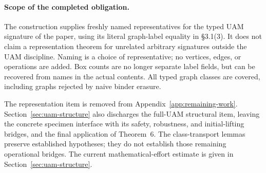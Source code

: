 


\paragraph{Scope of the completed obligation.}
The construction supplies freshly named representatives for the typed UAM
signature of the paper, using its literal graph-label equality in
\S3.1(3). It does not claim a representation theorem for unrelated arbitrary
signatures outside the UAM discipline. Naming is a choice of representative;
no vertices, edges, or operations are added. Box counts are no longer separate
label fields, but can be recovered from names in the actual contents. All typed
graph classes are covered, including graphs rejected by naive binder erasure.

The representation item is removed from Appendix~\ref{app:remaining-work}.
Section~\ref{sec:uam-structure} also discharges the full-UAM structural item,
leaving the concrete specimen interface with its safety, robustness, and
initial-lifting bridges, and the final application of Theorem~6. The
class-transport lemmas preserve established hypotheses; they do not establish
those remaining operational bridges. The current mathematical-effort estimate
is given in Section~\ref{sec:uam-structure}.
